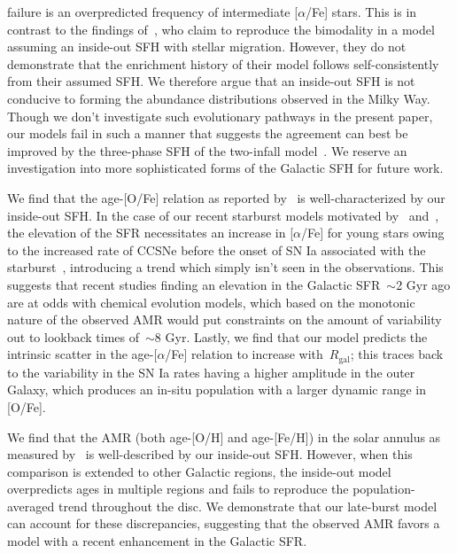 \documentclass[fleqn, usenatbib]{mnras}
\begin{document}
failure is an overpredicted frequency of intermediate [$\alpha$/Fe] stars. This 
is in contrast to the findings of~\citet{Sharma2020}, who claim to reproduce 
the bimodality in a model assuming an inside-out SFH with stellar migration. 
However, they do not demonstrate that the enrichment history of their model 
follows self-consistently from their assumed SFH. We therefore argue that 
an inside-out SFH is not conducive to forming the abundance distributions 
observed in the Milky Way. Though we don't investigate such evolutionary 
pathways in the present paper, our models fail in such a manner that suggests 
the agreement can best be improved by the three-phase SFH of the two-infall 
model~\citep{Chiappini1997, Chiappini2001, Romano2010, Grisoni2017, 
Noguchi2018, Palla2020, Spitoni2016, Spitoni2018, Spitoni2019a, Spitoni2020, 
Spitoni2021}. We reserve an investigation into more sophisticated forms of the 
Galactic SFH for future work. 
\par 
We find that the age-[O/Fe] relation as reported by~\citet{Feuillet2019} is 
well-characterized by our inside-out SFH. In the case of our recent 
starburst models motivated by~\citet{Mor2019} and~\citet{Isern2019}, the 
elevation of the SFR necessitates an increase in [$\alpha$/Fe] for young 
stars owing to the increased rate of CCSNe before the onset of SN Ia associated 
with the starburst~\citep{Johnson2020}, introducing a trend which simply isn't 
seen in the observations. This suggests that recent studies finding an 
elevation in the 
Galactic SFR~$\sim$2 Gyr ago are at odds with chemical evolution models, which 
based on the monotonic nature of the observed AMR would put constraints on the 
amount of variability out to lookback times of~$\sim$8 Gyr. Lastly, we find 
that our model predicts the intrinsic scatter in the age-[$\alpha$/Fe] relation 
to increase with~$R_\text{gal}$; this traces back to the variability in the SN 
Ia rates having a higher amplitude in the outer Galaxy, which produces an 
in-situ population with a larger dynamic range in [O/Fe]. 
\par 
We find that the AMR (both age-[O/H] and age-[Fe/H]) in the solar annulus as 
measured by~\citet{Feuillet2019} is well-described by our inside-out SFH. 
However, when this comparison is extended to other Galactic regions, the 
inside-out model overpredicts ages in multiple regions and fails to reproduce 
the population-averaged trend throughout the disc. We demonstrate that our 
late-burst model can account for these discrepancies, suggesting that the 
observed AMR favors a model with a recent enhancement in the Galactic SFR. 
\end{document}
